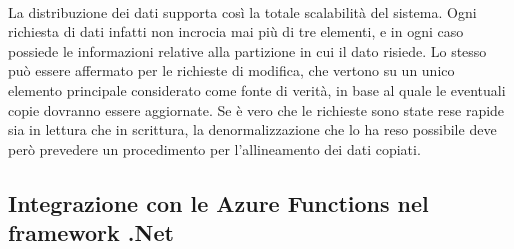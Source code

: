 \\
La distribuzione dei dati supporta così la totale scalabilità del sistema.
Ogni richiesta di dati infatti non incrocia mai più di tre elementi,
e in ogni caso possiede le informazioni relative alla partizione in cui il dato risiede.
Lo stesso può essere affermato per le richieste di modifica, 
che vertono su un unico elemento principale considerato come fonte di verità,
in base al quale le eventuali copie dovranno essere aggiornate.
Se è vero che le richieste sono state rese rapide 
sia in lettura che in scrittura,
la denormalizzazione che lo ha reso possibile
deve però prevedere un procedimento per l'allineamento dei dati copiati.
\clearpage

\subsection{Integrazione con le Azure Functions nel framework .Net}


